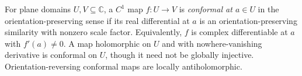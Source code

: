 
For plane domains $U,V\subseteq\mathbb C$, a $C^1$ map $f:U\to V$ is \emph{conformal at $a\in U$} in the orientation-preserving sense if its real differential at $a$ is an orientation-preserving similarity with nonzero scale factor. Equivalently, $f$ is complex differentiable at $a$ with $f'(a)\ne0$. A map holomorphic on $U$ and with nowhere-vanishing derivative is conformal on $U$, though it need not be globally injective. Orientation-reversing conformal maps are locally antiholomorphic.
